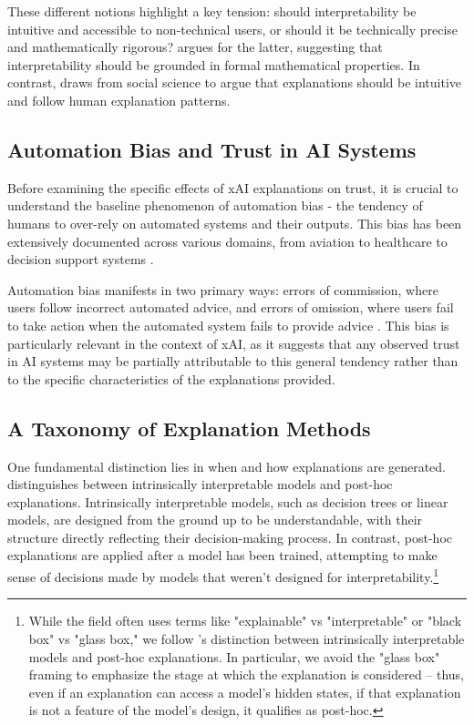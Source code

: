 These different notions highlight a key tension: should interpretability be intuitive and accessible to non-technical users, or should it be technically precise and mathematically rigorous? \textcite{rudin_stop_2019} argues for the latter, suggesting that interpretability should be grounded in formal mathematical properties. In contrast, \textcite{miller_explanation_2017} draws from social science to argue that explanations should be intuitive and follow human explanation patterns.

\subsection{Automation Bias and Trust in AI Systems}\label{ssec:automation_bias}
Before examining the specific effects of xAI explanations on trust, it is crucial to understand the baseline phenomenon of automation bias - the tendency of humans to over-rely on automated systems and their outputs. This bias has been extensively documented across various domains, from aviation to healthcare to decision support systems \cite{mosier_automation_1996, parasuraman_automation_2000, skitka_automation_1999}.

Automation bias manifests in two primary ways: errors of commission, where users follow incorrect automated advice, and errors of omission, where users fail to take action when the automated system fails to provide advice \cite{mosier_automation_1996}. This bias is particularly relevant in the context of xAI, as it suggests that any observed trust in AI systems may be partially attributable to this general tendency rather than to the specific characteristics of the explanations provided.

\subsection{A Taxonomy of Explanation Methods}\label{ssec:explanation_taxonomy}
One fundamental distinction lies in when and how explanations are generated. \textcite{molnar_interpretable_2019} distinguishes between intrinsically interpretable models and post-hoc explanations. Intrinsically interpretable models, such as decision trees or linear models, are designed from the ground up to be understandable, with their structure directly reflecting their decision-making process. In contrast, post-hoc explanations are applied after a model has been trained, attempting to make sense of decisions made by models that weren't designed for interpretability.\footnote{While the field often uses terms like "explainable" vs "interpretable" or "black box" vs "glass box," we follow \textcite{molnar_interpretable_2019}'s distinction between intrinsically interpretable models and post-hoc explanations. In particular, we avoid the "glass box" framing to emphasize the stage at which the explanation is considered – thus, even if an explanation can access a model's hidden states, if that explanation is not a feature of the model's design, it qualifies as post-hoc.}

